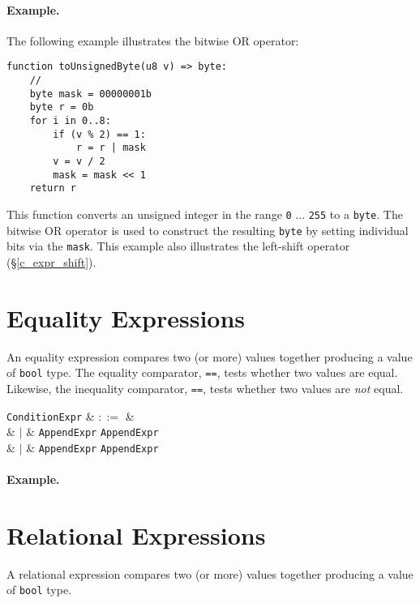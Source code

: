 \paragraph{Example.}  The following example illustrates the bitwise OR operator:

\begin{lstlisting}
function toUnsignedByte(u8 v) => byte:
    //
    byte mask = 00000001b
    byte r = 0b
    for i in 0..8:
        if (v % 2) == 1:
            r = r | mask
        v = v / 2
        mask = mask << 1
    return r  
\end{lstlisting}

This function converts an unsigned integer in the range \lstinline{0} ... \lstinline{255} to a \lstinline{byte}.  The bitwise OR operator is used to construct the resulting \lstinline{byte} by setting individual bits via the \lstinline{mask}.  This example also illustrates the left-shift operator (\S\ref{c_expr_shift}).


\section{Equality Expressions}
\label{c_expr_equality}
An equality expression compares two (or more) values together producing a value of \lstinline{bool} type.  The equality comparator, \lstinline{==}, tests whether two values are equal.  Likewise, the inequality comparator, \lstinline{==}, tests whether two values are {\em not} equal.

\begin{syntax}
  \verb+ConditionExpr+ & $::=$ &\\
  & $|$ & \verb+AppendExpr+ \token{==} \verb+AppendExpr+\\
  & $|$ & \verb+AppendExpr+ \token{!=} \verb+AppendExpr+\\
\end{syntax}

\paragraph{Example.}

\section{Relational Expressions}
\label{c_expr_relational}
A relational expression compares two (or more) values together producing a value of \lstinline{bool} type.  

